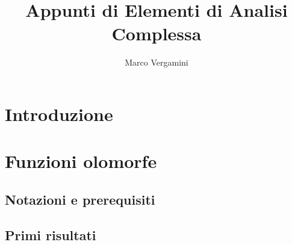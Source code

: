 \documentclass{article}
\title{Appunti di Elementi di Analisi Complessa}
\date{}
\author{Marco Vergamini}
\begin{document}
\maketitle
\newpage
\tableofcontents
\newpage


\section{Introduzione}


\newpage

\section{Funzioni olomorfe}

\subsection{Notazioni e prerequisiti}


\subsection{Primi risultati}

\end{document}
